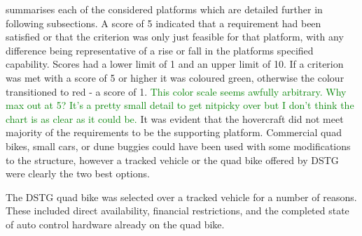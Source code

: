 \documentclass[main.tex]{subfiles}
\begin{document}
 summarises each of the considered platforms which are detailed further in following subsections. A score of 5 indicated that a requirement had been satisfied or that the criterion was only just feasible for that platform, with any difference being representative of a rise or fall in the platforms specified capability. Scores had a lower limit of 1 and an upper limit of 10. If a criterion was met with a score of 5 or higher it was coloured green, otherwise the colour transitioned to red - a score of 1. 
\textcolor{green}{This color scale seems awfully arbitrary. Why max out at 5? It's a pretty small detail to get nitpicky over but I don't think the chart is as clear as it could be.} It was evident that the hovercraft did not meet majority of the requirements to be the supporting platform. Commercial quad bikes, small cars, or dune buggies could have been used with some modifications to the structure, however a tracked vehicle or the quad bike offered by DSTG were clearly the two best options.

The DSTG quad bike was selected over a tracked vehicle for a number of reasons. These included direct availability, financial restrictions, and the completed state of auto control hardware already on the quad bike.
\end{document}
